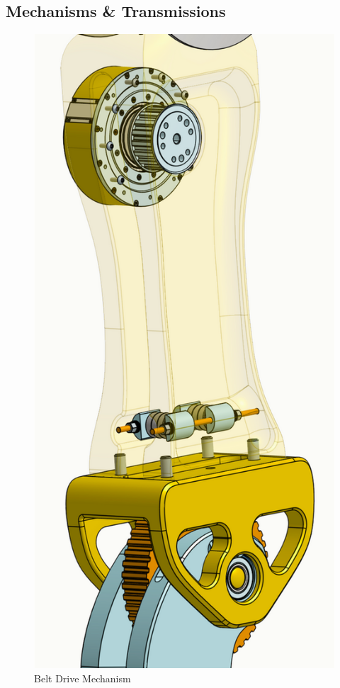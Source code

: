 \documentclass{article}
\begin{document}
\newpage
\subsection{Mechanisms \& Transmissions}

\begin{figure}[H]
    \centering
    \includegraphics[scale=0.8]{assets/Design Presentation/Belt Drive.png}
    \caption{Belt Drive Mechanism}
    \label{fig:enter-label}
\end{figure}
\end{document}
